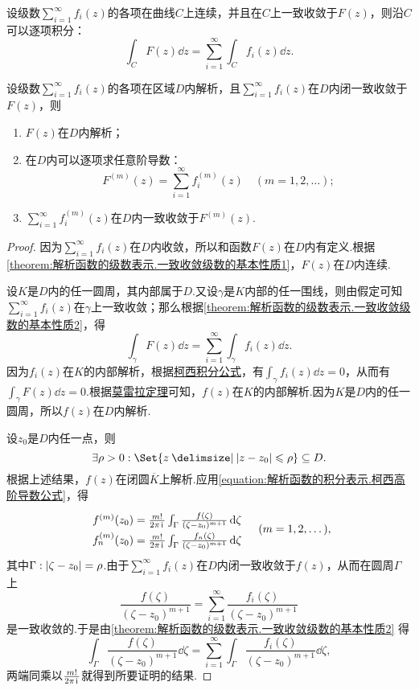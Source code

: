 \begin{theorem}\label{theorem:解析函数的级数表示.一致收敛级数的基本性质2}
设级数\(\sum\limits_{i=1}^{\infty} f_i(z)\)的各项在曲线\(C\)上连续，并且在\(C\)上一致收敛于\(F(z)\)，则沿\(C\)可以逐项积分：\[
\int_C F(z) \dd{z}
= \sum\limits_{i=1}^{\infty} \int_C f_i(z) \dd{z}.
\]
\end{theorem}

\begin{theorem}[魏尔斯特拉斯定理]\label{theorem:解析函数的级数表示.魏尔斯特拉斯定理}
设级数\(\sum\limits_{i=1}^{\infty} f_i(z)\)的各项在区域\(D\)内解析，且\(\sum\limits_{i=1}^{\infty} f_i(z)\)在\(D\)内闭一致收敛于\(F(z)\)，则\begin{enumerate}
\item \(F(z)\)在\(D\)内解析；
\item 在\(D\)内可以逐项求任意阶导数：\[
F^{(m)}(z) = \sum\limits_{i=1}^{\infty} f_i^{(m)}(z)
\quad(m=1,2,\dotsc);
\]
\item \(\sum\limits_{i=1}^{\infty} f_i^{(m)}(z)\)在\(D\)内一致收敛于\(F^{(m)}(z)\).
\end{enumerate}
\begin{proof}
因为\(\sum\limits_{i=1}^{\infty} f_i(z)\)在\(D\)内收敛，所以和函数\(F(z)\)在\(D\)内有定义.根据\cref{theorem:解析函数的级数表示.一致收敛级数的基本性质1}，\(F(z)\)在\(D\)内连续.

设\(K\)是\(D\)内的任一圆周，其内部属于\(D\).又设\(\gamma\)是\(K\)内部的任一围线，则由假定可知\(\sum\limits_{i=1}^{\infty} f_i(z)\)在\(\gamma\)上一致收敛；那么根据\cref{theorem:解析函数的级数表示.一致收敛级数的基本性质2}，得\[
\int_{\gamma} F(z) \dd{z} = \sum\limits_{i=1}^{\infty} \int_{\gamma} f_i(z) \dd{z}.
\]因为\(f_i(z)\)在\(K\)的内部解析，根据\hyperref[equation:解析函数的积分表示.柯西积分公式]{柯西积分公式}，有\(\int_{\gamma} f_i(z) \dd{z} = 0\)，从而有\(\int_{\gamma} F(z) \dd{z} = 0\).根据\hyperref[theorem:解析函数的积分表示.莫雷拉定理]{莫雷拉定理}可知，\(f(z)\)在\(K\)的内部解析.因为\(K\)是\(D\)内的任一圆周，所以\(f(z)\)在\(D\)内解析.

\def\f#1{f\ifx\relax#1\relax\else_{#1}\fi^{(m)}(z_0) = \frac{m!}{2\pi\iu} \int_{\Gamma} \frac{f\ifx\relax#1\relax\else_{#1}\fi(\zeta)}{(\zeta-z_0)^{m+1}} \dd{\zeta}}
设\(z_0\)是\(D\)内任一点，则\[
\exists \rho > 0 : \Set{ z \given \abs{z-z_0} \leqslant \rho } \subseteq D.
\]根据上述结果，\(f(z)\)在闭圆\(\overline{K}\)上解析.应用\cref{equation:解析函数的积分表示.柯西高阶导数公式}，得\[
\def\arraystretch{1.5}
\begin{array}{l}
\f{} \\
\f{n}
\end{array}
\quad(m=1,2,\dotsc),
\]其中\(\Gamma: \abs{\zeta-z_0}=\rho\).由于\(\sum\limits_{i=1}^{\infty} f_i(z)\)在\(D\)内闭一致收敛于\(f(z)\)，从而在圆周\(\Gamma\)上\[
\frac{f(\zeta)}{(\zeta-z_0)^{m+1}}
= \sum\limits_{i=1}^{\infty} \frac{f_i(\zeta)}{(\zeta-z_0)^{m+1}}
\]是一致收敛的.于是由\cref{theorem:解析函数的级数表示.一致收敛级数的基本性质2} 得\[
\int_{\Gamma} \frac{f(\zeta)}{(\zeta-z_0)^{m+1}} \dd{\zeta}
= \sum\limits_{i=1}^{\infty} \int_{\Gamma} \frac{f_i(\zeta)}{(\zeta-z_0)^{m+1}} \dd{\zeta},
\]两端同乘以\(\frac{m!}{2\pi\kern1pt\mathrm{i}\kern1pt}\)就得到所要证明的结果.
\end{proof}
\end{theorem}

